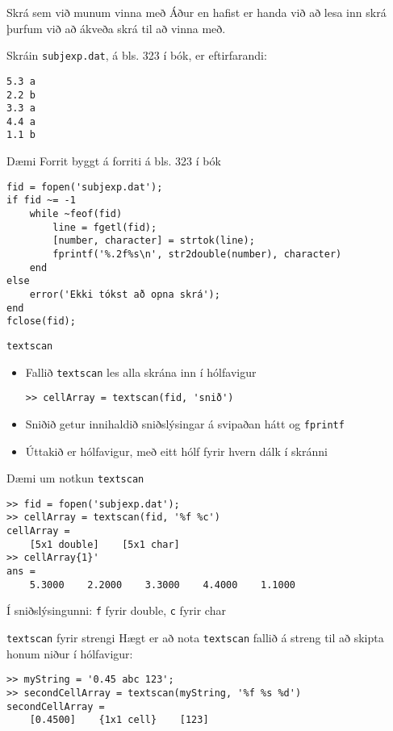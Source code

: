 \documentclass[handout]{beamer}
\begin{document}
\begin{frame}[fragile]{Skrá sem við munum vinna með}
Áður en hafist er handa við að lesa inn skrá þurfum við að ákveða skrá til að vinna með.

Skráin \texttt{subjexp.dat}, á bls. 323 í bók, er eftirfarandi:
\begin{verbatim}
5.3	a
2.2	b
3.3	a
4.4	a
1.1	b
\end{verbatim}

\end{frame}


\begin{frame}[fragile]{Dæmi}
Forrit byggt á forriti á bls. 323 í bók
\begin{verbatim}
fid = fopen('subjexp.dat');
if fid ~= -1
    while ~feof(fid)
        line = fgetl(fid);
        [number, character] = strtok(line);
        fprintf('%.2f%s\n', str2double(number), character)
    end
else
    error('Ekki tókst að opna skrá');
end
fclose(fid);
\end{verbatim}
\end{frame}

\begin{frame}[fragile]{\texttt{textscan}}
\begin{itemize}
 \item Fallið \texttt{textscan} les alla skrána inn í hólfavigur
\begin{verbatim}
>> cellArray = textscan(fid, 'snið')
\end{verbatim}
 \item Sniðið getur innihaldið sniðslýsingar á svipaðan hátt og \texttt{fprintf}
 \item Úttakið er hólfavigur, með eitt hólf fyrir hvern dálk í skránni
\end{itemize}
\end{frame}

\begin{frame}[fragile]{Dæmi um notkun \texttt{textscan}}
\begin{verbatim}
>> fid = fopen('subjexp.dat');
>> cellArray = textscan(fid, '%f %c')
cellArray = 
    [5x1 double]    [5x1 char]
>> cellArray{1}'
ans =
    5.3000    2.2000    3.3000    4.4000    1.1000
\end{verbatim}
Í sniðslýsingunni: \texttt{f} fyrir double, \texttt{c} fyrir char
\end{frame}

\begin{frame}[fragile]{\texttt{textscan} fyrir strengi}
Hægt er að nota \texttt{textscan} fallið á streng til að skipta honum niður í hólfavigur:
\begin{verbatim}
>> myString = '0.45 abc 123';
>> secondCellArray = textscan(myString, '%f %s %d')
secondCellArray = 
    [0.4500]    {1x1 cell}    [123]
\end{verbatim}
\end{frame}
\end{document}
